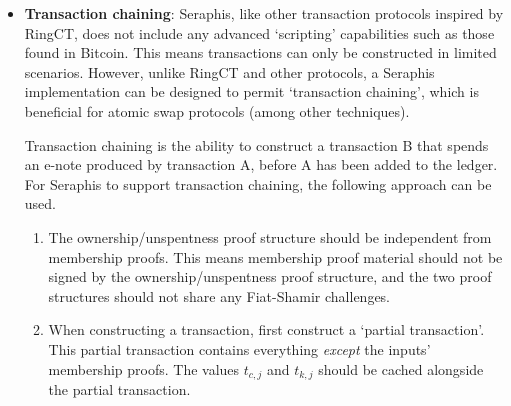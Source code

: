 \begin{itemize}
    \item \textbf{Transaction chaining}: Seraphis, like other transaction protocols inspired by RingCT, does not include any advanced `scripting' capabilities such as those found in Bitcoin. This means transactions can only be constructed in limited scenarios. However, unlike RingCT and other protocols, a Seraphis implementation can be designed to permit `transaction chaining', which is beneficial for atomic swap protocols \cite{atomic-swaps-paper} (among other techniques).

    Transaction chaining is the ability to construct a transaction B that spends an e-note produced by transaction A, before A has been added to the ledger. For Seraphis to support transaction chaining, the following approach can be used.

    \begin{enumerate}
        \item The ownership/unspentness proof structure should be independent from membership proofs. This means membership proof material should not be signed by the ownership/unspentness proof structure, and the two proof structures should not share any Fiat-Shamir challenges.

        \item When constructing a transaction, first construct a `partial transaction'. This partial transaction contains everything {\em except} the inputs' membership proofs. The values $t_{c,j}$ and $t_{k,j}$ should be cached alongside the partial transaction.


\end{enumerate}
\end{itemize}
